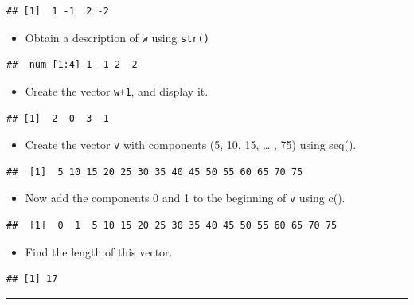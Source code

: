 \documentclass[
]{book}
\providecommand{\tightlist}{%
  \setlength{\itemsep}{0pt}\setlength{\parskip}{0pt}}
\begin{document}
\begin{verbatim}
## [1]  1 -1  2 -2
\end{verbatim}

\begin{itemize}
\tightlist
\item
  Obtain a description of \texttt{w} using \texttt{str()}
\end{itemize}

\begin{verbatim}
##  num [1:4] 1 -1 2 -2
\end{verbatim}

\begin{itemize}
\tightlist
\item
  Create the vector \texttt{w+1}, and display it.
\end{itemize}

\begin{verbatim}
## [1]  2  0  3 -1
\end{verbatim}

\begin{itemize}
\tightlist
\item
  Create the vector \texttt{v} with components (5, 10, 15, \ldots{} , 75) using seq().
\end{itemize}

\begin{verbatim}
##  [1]  5 10 15 20 25 30 35 40 45 50 55 60 65 70 75
\end{verbatim}

\begin{itemize}
\tightlist
\item
  Now add the components 0 and 1 to the beginning of \texttt{v} using c().
\end{itemize}

\begin{verbatim}
##  [1]  0  1  5 10 15 20 25 30 35 40 45 50 55 60 65 70 75
\end{verbatim}

\begin{itemize}
\tightlist
\item
  Find the length of this vector.
\end{itemize}

\begin{verbatim}
## [1] 17
\end{verbatim}

\begin{center}\rule{0.5\linewidth}{0.5pt}\end{center}
\end{document}
